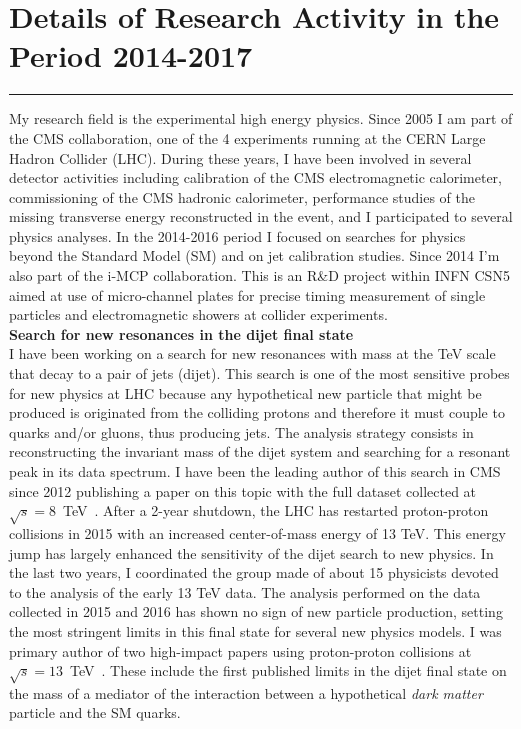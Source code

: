 \documentclass[10pt, a4paper]{article}
\begin{document}
\section*{Details of Research Activity in the Period 2014-2017}
\vspace{-5pt}
\hrule
\vspace{10pt}
My research field is the experimental high energy physics. Since 2005
I am part of the CMS collaboration, one of the 4 experiments running at
the CERN Large Hadron Collider (LHC). During these years, I have been
involved in several detector activities including calibration of the
CMS electromagnetic calorimeter, commissioning of the CMS hadronic
calorimeter, performance studies of the missing transverse energy
reconstructed in the event, and I participated to several physics analyses.
In the 2014-2016 period I focused on searches for physics beyond the
Standard Model (SM) and on jet calibration studies. 
Since 2014 I'm also part of the i-MCP collaboration. This is
an R\&D project within INFN CSN5 aimed at use of micro-channel plates for
precise timing measurement of single particles and electromagnetic showers
at collider experiments. \\[1em]

{\bf Search for new resonances in the dijet final state}\\[0.5em]
I have been working on a search for new resonances with mass at the TeV
scale that decay to a pair of jets (dijet). This search is one of the most 
sensitive probes for new physics at LHC because any hypothetical new
particle that might be produced is originated from the
colliding protons and therefore it must couple to quarks and/or
gluons, thus producing jets. The analysis strategy consists in
reconstructing the invariant mass of the dijet system and searching for a
resonant peak in its data spectrum. I have been the leading author of this
search in CMS since 2012 publishing a paper on this topic with the
full dataset collected at $\sqrt{s}=8$~TeV~\cite{Khachatryan:2015sja}. After a 2-year
shutdown, the LHC has restarted proton-proton collisions in 2015 with an increased 
center-of-mass energy of 13 TeV. This energy jump has largely enhanced the
sensitivity of the dijet search to new physics. In the last two years, 
I coordinated the group
made of about 15 physicists devoted to the
analysis of the early 13 TeV data. The analysis performed on the data
collected in 2015 and 2016 has shown no sign of new particle
production, setting the most stringent limits in this final state 
for several new physics models. 
I was primary author of two high-impact papers using proton-proton
collisions at
$\sqrt{s}=13$~TeV~\cite{Sirunyan:2016iap,Khachatryan:2015dcf}.
These include the first published limits in the dijet final state on the
mass of a mediator of the interaction between a hypothetical 
{\it dark matter} particle and the SM quarks. \\[1em]
\end{document}
